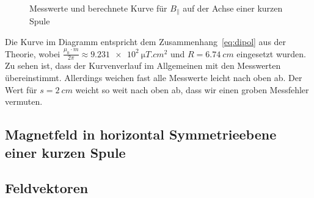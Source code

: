\begin{figure}[H]
\centering
{}
\caption{Messwerte und berechnete Kurve für $B_\parallel$ auf der Achse einer kurzen Spule}
\label{fig:axialaufachsekurz}
\end{figure}

Die Kurve im Diagramm entspricht dem Zusammenhang~\cref{eq:dipol} aus der Theorie, wobei $\frac{\mu_0\cdot m}{2\pi}\approx \SI{9.231e2}{\micro T.cm^2}$ und $R=\SI{6.74}{cm}$ eingesetzt wurden.
Zu sehen ist, dass der Kurvenverlauf im Allgemeinen mit den Messwerten übereinstimmt. Allerdings weichen fast alle Messwerte leicht nach oben ab. Der Wert für $s=\SI{2}{cm}$ weicht so weit nach oben ab, dass wir einen groben Messfehler vermuten.
\subsection{Magnetfeld in horizontal Symmetrieebene einer kurzen Spule}

\subsection{Feldvektoren}

